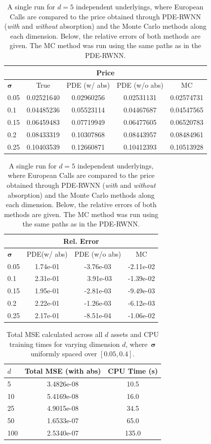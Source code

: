 \begin{center}
\begin{table}[hbt!]
\centering
\begin{tabular}{l|cccc}
\multicolumn{5}{c}{Price} \\
\hline
$\boldsymbol\sigma$ & True & PDE (w/ abs) & PDE (w/o abs)  & MC    \\
\hline
0.05 & 0.02521640 & 0.02960256  &  0.02531131  &  0.02574731  \\
0.1  & 0.04485236 &  0.05523114 &  0.04467687  &  0.04547565  \\
0.15 & 0.06459483 &  0.07719949 &  0.06477605  &  0.06520783  \\
0.2  & 0.08433319 &  0.10307868 &  0.08443957  &  0.08484961  \\
0.25 & 0.10403539 &  0.12660871 &  0.10412393  &  0.10513928 
\end{tabular}
\begin{tabular}{l|ccc}
\multicolumn{4}{c}{Rel. Error} \\
\hline
 $\boldsymbol\sigma$ & PDE(w/ abs) & PDE (w/o abs) & MC    \\
\hline
0.05 & 1.74e-01 & -3.76e-03 & -2.11e-02 \\
0.1  & 2.31e-01 & ~3.91e-03 & -1.39e-02 \\
0.15 & 1.95e-01 & -2.81e-03 &	-9.49e-03 \\
0.2  & 2.22e-01 & -1.26e-03 &	-6.12e-03 \\
0.25 & 2.17e-01 & -8.51e-04 &	-1.06e-02
\end{tabular}
\caption{A single run for $d=5$ independent underlyings, where European Calls are compared to the price obtained through PDE-RWNN (\textit{with} and \textit{without} absorption) and the Monte Carlo methods along each dimension. Below, the relative errors of both methods are given. The MC method was run using the same paths as in the PDE-RWNN.}\label{tab:BS_d5}
\end{table}
\end{center}


\begin{center}
\begin{table}[hbt!]
\centering
\begin{tabular}{l|cc}
$d$  & Total MSE (with abs) & CPU Time (s) \\
\hline
5   & 3.4826e-08 & 10.5        \\
10  & 5.4169e-08 & 16.0        \\
25  & 4.9015e-08 & 34.5        \\
50  & 1.6533e-07 & 65.0       \\
100 & 2.5340e-07 & 135.0         
\end{tabular}
\caption{Total MSE calculated across all $d$ assets and CPU training times for varying dimension $d$, where~$\boldsymbol\sigma$ uniformly spaced over $[0.05, 0.4]$.}\label{tab:BS_MSE_time}
\end{table}
\end{center}

